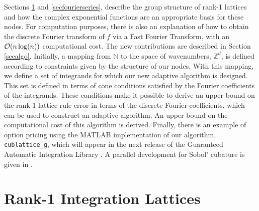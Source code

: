 \documentclass[graybox]{svmult}
\newcommand{\Z}{\mathbb{Z}} %
\newcommand{\N}{\mathbb{N}} %
\begin{document}
Sections \ref{secrank1lat} and \ref{secfourierseries}, describe the group structure of rank-1 lattices and how the complex exponential functions are an appropriate basis for these nodes. For computation purposes, there is also an explanation of how to obtain the discrete Fourier transform of $f$ via a Fast Fourier Transform, with an $\mathcal{O}(n \log(n))$ computational cost.  The new contributions are described in Section \ref{secalgo}. Initially, a mapping from $\N$ to the space of wavenumbers, $\Z^d$, is defined according to constraints given by the structure of our nodes. With this mapping, we define a set of integrands for which our new adaptive algorithm is designed.  This set is defined in terms of cone conditions satisfied by the Fourier coefficients of the integrands. These conditions make it possible to derive an upper bound on the rank-1 lattice rule error in terms of the discrete Fourier coefficients, which can be used to construct an adaptive algorithm.  An upper bound on the computational cost of this algorithm is derived. Finally, there is an example of option pricing using the MATLAB implementation of our algorithm, \texttt{cublattice\_g}, which will appear in the next release of the Guaranteed Automatic Integration Library \cite{ChoEtal14a}.  A parallel development for Sobol' cubature is given in \cite{HicJim16a}.

\section{Rank-1 Integration Lattices}\label{secrank1lat}
\end{document}
